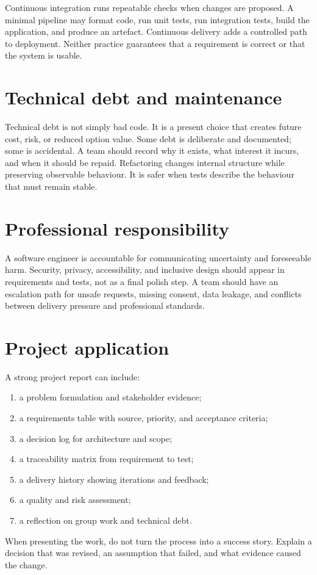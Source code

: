 Continuous integration runs repeatable checks when changes are proposed. A minimal pipeline may format code, run unit tests, run integration tests, build the application, and produce an artefact. Continuous delivery adds a controlled path to deployment. Neither practice guarantees that a requirement is correct or that the system is usable.

\section{Technical debt and maintenance}
Technical debt is not simply bad code. It is a present choice that creates future cost, risk, or reduced option value. Some debt is deliberate and documented; some is accidental. A team should record why it exists, what interest it incurs, and when it should be repaid. Refactoring changes internal structure while preserving observable behaviour. It is safer when tests describe the behaviour that must remain stable.

\section{Professional responsibility}
A software engineer is accountable for communicating uncertainty and foreseeable harm. Security, privacy, accessibility, and inclusive design should appear in requirements and tests, not as a final polish step. A team should have an escalation path for unsafe requests, missing consent, data leakage, and conflicts between delivery pressure and professional standards.

\section{Project application}
A strong project report can include:
\begin{enumerate}
\item a problem formulation and stakeholder evidence;
\item a requirements table with source, priority, and acceptance criteria;
\item a decision log for architecture and scope;
\item a traceability matrix from requirement to test;
\item a delivery history showing iterations and feedback;
\item a quality and risk assessment;
\item a reflection on group work and technical debt.
\end{enumerate}
When presenting the work, do not turn the process into a success story. Explain a decision that was revised, an assumption that failed, and what evidence caused the change.


